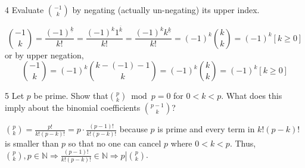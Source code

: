 \documentclass[a4paper,12pt]{article}
\makeatletter
\newtheorem*{solution}{Solution}
\theoremstyle{definition}
\renewenvironment{solution}[1][Solution] {\par\pushQED{\qed}\normalfont\topsep6\p@\@plus6\p@\relax\trivlist\item[\hskip\labelsep\bfseries#1\@addpunct{.}]\ignorespaces}{\popQED\endtrivlist\@endpefalse} \makeatother
\newenvironment{problems}{\begin{list}{}{\renewcommand{\makelabel}[1]{\textbf{##1}\hfil}}}{\end{list}}
\makeatother
\begin{document}
\begin{problems}
    \item[4]Evaluate $\binom{-1}{k}$ by negating (actually un-negating) its upper index.
    \begin{solution}
        \begin{equation*}
            \binom{-1}{k} = \frac{(-1)^{\underline{k}}}{k!} = \frac{(-1)^k1^{\overline{k}}}{k!} = \frac{(-1)^k k^{\underline{k}}}{k!} = (-1)^k \binom{k}{k} = (-1)^k [k\geq 0]
        \end{equation*}
        or by upper negation,
        \begin{equation*}
            \binom{-1}{k} = (-1)^k \binom{k-(-1)-1}{k} = (-1)^k \binom{k}{k} = (-1)^k [k\geq 0]
        \end{equation*}
    \end{solution} 
    \item[5]Let $p$ be prime. Show that$\binom{p}{k} \bmod{p}=0$ for $0 < k < p$.  What does this imply about the binomial coefficients $\binom{p-1}{k}$?
    \begin{solution}
        $\binom{p}{k} = \frac{p!}{k!(p-k)!} = p \cdot \frac{(p-1)!}{k!(p-k)!}$ because $p$ is prime and every term in $k!(p-k)!$ is smaller than $p$ so that no one can cancel $p$ where $0<k<p$. Thus, $\binom{p}{k},p\in\mathbb{N}\Rightarrow \frac{(p-1)!}{k!(p-k)!}\in\mathbb{N}\Rightarrow p\left|\binom{p}{k}\right.$.


\end{solution}
\end{problems}
\end{document}
